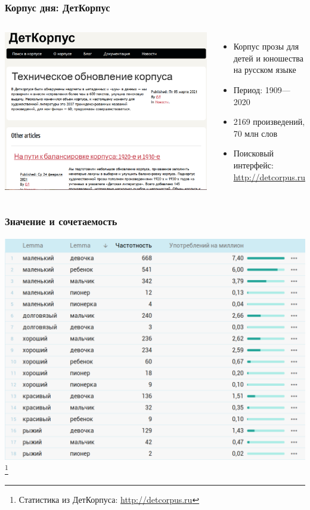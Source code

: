 \documentclass[10pt,svgnames]{beamer}
\begin{document}
\begin{frame}
  \frametitle{Корпус дня: ДетКорпус}
  \begin{columns}
    \includegraphics[width=\textwidth]{detcorpus.png}
    \begin{itemize}
    \item Корпус прозы для детей и юношества на русском языке
    \item Период: 1909—2020
    \item 2169 произведений, 70 млн слов
    \item Поисковый интерфейс: \href{http://detcorpus.ru}{http://detcorpus.ru}
    \end{itemize}
  \end{columns}
\end{frame}

\begin{frame}
  \frametitle{Значение и сочетаемость}
  \includegraphics[width=.9\textwidth]{adjectives.png}\footnote{Статистика
  из ДетКорпуса: \href{http://detcorpus.ru}{http://detcorpus.ru}}
\end{frame}
\end{document}

